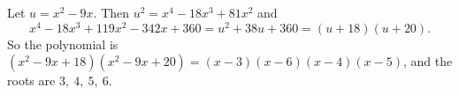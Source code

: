 Let $u=x^2-9x$. Then $u^2=x^4-18x^3+81x^2$ and
\[x^4-18x^3+119x^2-342x+360=u^2+38u+360=(u+18)(u+20).\]
So the polynomial is $\left(x^2-9x+18\right)\left(x^2-9x+20\right)=(x-3)(x-6)(x-4)(x-5)$, and the roots are $\boxed{3,\ 4,\ 5,\ 6}$.
